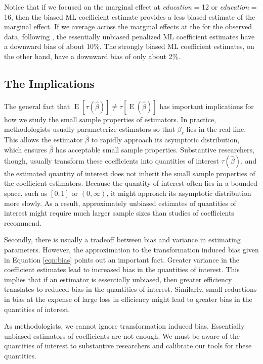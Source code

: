 \documentclass[12pt]{article}
\DeclareMathOperator*{\E}{\text{E}}
\begin{document}
Notice that if we focused on the marginal effect at \textit{education} = 12 or \textit{education} = 16, then the biased ML coefficient estimate provides a less biased estimate of the marginal effect. If we average across the marginal effects at the for the observed data, following \cite{HanmerKalkan2013}, the essentially unbiased penalized ML coefficient estimates have a downward bias of about 10\%. The strongly biased ML coefficient estimates, on the other hand, have a downward bias of only about 2\%.

\subsection*{The Implications}

The general fact that $\E[\tau(\hat\beta)] \neq \tau[\E(\hat\beta)]$ has important implications for how we study the small sample properties of estimators. In practice, methodologists usually parameterize estimators so that $\beta_r$ lies in the real line. This allows the estimator $\hat{\beta}$ to rapidly approach its asymptotic distribution, which ensures $\hat{\beta}$ has acceptable small sample properties. Substantive researchers, though, usually transform these coefficients into quantities of interest $\tau(\hat{\beta})$, and the estimated quantity of interest does not inherit the small sample properties of the coefficient estimators. Because the quantity of interest often lies in a bounded space, such as $[0, 1]$ or $(0, \infty)$, it might approach its asymptotic distribution more slowly. As a result, approximately unbiased estimates of quantities of interest might require much larger sample sizes than studies of coefficients recommend.

Secondly, there is usually a tradeoff between bias and variance in estimating parameters. However, the approximation to the transformation induced bias given in Equation \ref{eqn:bias} points out an important fact. Greater variance in the coefficient estimates lead to increased bias in the quantities of interest. This implies that if an estimator is essentially unbiased, then greater efficiency translates to reduced bias in the quantities of interest. Similarly, small reductions in bias at the expense of large loss in efficiency might lead to greater bias in the quantities of interest. 

As methodologists, we cannot ignore transformation induced bias. Essentially unbiased estimators of coefficients are not enough. We must be aware of the quantities of interest to substantive researchers and calibrate our tools for these quantities.

\singlespace 
\small


\end{document}
